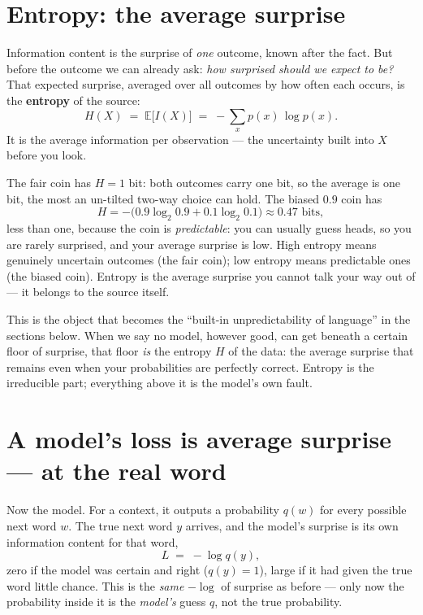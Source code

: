 \documentclass[11pt]{article}
\begin{document}
\section{Entropy: the average surprise}

Information content is the surprise of \emph{one} outcome, known after the fact. But before the
outcome we can already ask: \emph{how surprised should we expect to be?} That expected surprise,
averaged over all outcomes by how often each occurs, is the \textbf{entropy} of the source:
\[
  H(X) \;=\; \mathbb{E}\bigl[I(X)\bigr] \;=\; -\sum_x p(x)\,\log p(x).
\]
It is the average information per observation --- the uncertainty built into $X$ before you look.

The fair coin has $H = 1$ bit: both outcomes carry one bit, so the average is one bit, the most
an un-tilted two-way choice can hold. The biased $0.9$ coin has
\[
  H = -\bigl(0.9\log_2 0.9 + 0.1\log_2 0.1\bigr) \approx 0.47 \text{ bits},
\]
less than one, because the coin is \emph{predictable}: you can usually guess heads, so you are
rarely surprised, and your average surprise is low. High entropy means genuinely uncertain
outcomes (the fair coin); low entropy means predictable ones (the biased coin). Entropy is the
average surprise you cannot talk your way out of --- it belongs to the source itself.

\begin{insight}
This is the object that becomes the ``built-in unpredictability of language'' in the sections
below. When we say no model, however good, can get beneath a certain floor of surprise, that
floor \emph{is} the entropy $H$ of the data: the average surprise that remains even when your
probabilities are perfectly correct. Entropy is the irreducible part; everything above it is the
model's own fault.
\end{insight}

\section{A model's loss is average surprise --- at the real word}

Now the model. For a context, it outputs a probability $q(w)$ for every possible next word $w$.
The true next word $y$ arrives, and the model's surprise is its own information content for that
word,
\[
  L \;=\; -\log q(y),
\]
zero if the model was certain and right ($q(y) = 1$), large if it had given the true word little
chance. This is the \emph{same} $-\log$ of surprise as before --- only now the probability inside
it is the \emph{model's} guess $q$, not the true probability.
\end{document}
